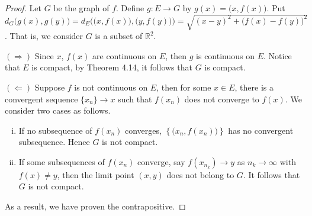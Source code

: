 \begin{Exercise}
	\begin{proof}
		Let $G$ be the graph of $f$.
		Define $g:E\to G$ by $g(x) = \big( x,f(x) \big)$.
		Put $d_G\big( g(x), g(y) \big) = d_E\Big( \big(x, f(x) \big), \big( y, f(y) \big)\Big) = \sqrt{(x-y)^2 + \big(f(x)-f(y)\big)^2}$. That is, we consider $G$ is a subset of $\mathbb{R}^2$.
		
		$(\Longrightarrow)$
		Since $x$, $f(x)$ are continuous on $E$, then $g$ is continuous on $E$.
		Notice that $E$ is compact, by Theorem 4.14, it follows that $G$ is compact.
		
		$(\Longleftarrow)$
		Suppose $f$ is not continuous on $E$, then for some $x\in E$, there is a convergent sequence $\{x_n\}\to x$ such that $f(x_n)$ does not converge to $f(x)$. We consider two cases as follows.
		\begin{enumerate}[i)]
			\item If no subsequence of $f(x_n)$ converges, $\left\{\big(x_n,f(x_n)\big) \right\}$ has no convergent subsequence.
			Hence $G$ is not compact.
			
			\item If some subsequences of $f(x_n)$ converge, say $f(x_{n_k})\to y$ as $n_k\to \infty$ with $f(x) \neq y$, then the limit point $(x,y)$ does not belong to $G$.
			It follows that $G$ is not compact.
		\end{enumerate}
		As a result, we have proven the contrapositive.
	\end{proof}
\end{Exercise}